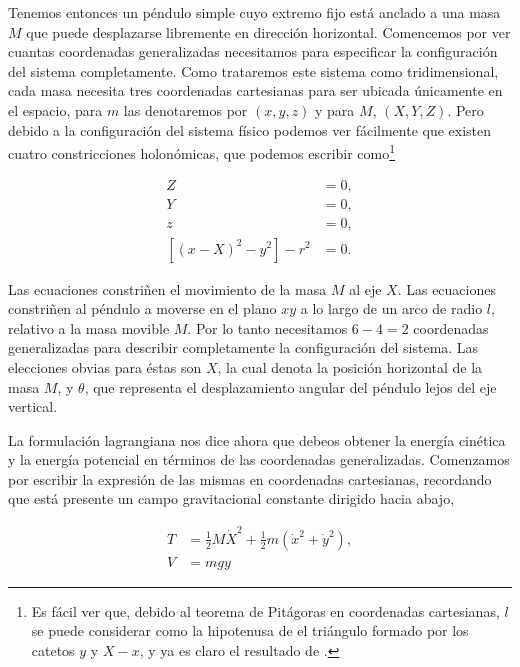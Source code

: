 \documentclass[a4paper,10pt]{article}
\numberwithin{equation}{section}
\begin{document}
Tenemos entonces un péndulo simple cuyo extremo fijo está anclado a una masa $M$ que 
puede desplazarse libremente en dirección horizontal. Comencemos por ver cuantas coordenadas
generalizadas necesitamos para especificar la configuración del sistema completamente. 
Como trataremos este sistema como tridimensional, cada masa necesita tres coordenadas 
cartesianas para ser ubicada únicamente en el espacio, para $m$ las denotaremos por 
$(x,y,z)$ y para $M$, $(X,Y,Z)$. Pero debido a la configuración del sistema físico 
podemos ver fácilmente que existen cuatro constricciones holonómicas, que podemos 
escribir como\footnote{Es fácil ver que, debido al teorema de Pitágoras en coordenadas
cartesianas, $l$ se puede considerar como la hipotenusa de el triángulo formado 
por los catetos $y$ y $X-x$, y ya es claro el resultado de .}

\begin{align}
\label{eq:pendu1}
 Z &= 0, \\
\label{eq:pendu2}
 Y &= 0, \\
\label{eq:pendu3}
 z &= 0, \\
\label{eq:pendu4}
 [(x-X)^2 - y^2] - r^2 &= 0.
\end{align}

Las ecuaciones  constriñen el movimiento de la masa $M$ 
al eje $X$. Las ecuaciones  constriñen al péndulo a moverse 
en el plano $xy$ a lo largo de un arco de radio $l$, relativo a la masa movible $M$. Por 
lo tanto necesitamos $6-4 = 2$ coordenadas generalizadas para describir completamente 
la configuración del sistema. Las elecciones obvias para éstas son $X$, la cual denota 
la posición horizontal de la masa $M$, y $\theta$, que representa el desplazamiento 
angular del péndulo lejos del eje vertical.

\vspace{.3cm}

La formulación lagrangiana nos dice ahora que debeos obtener la energía cinética y la 
energía potencial en términos de las coordenadas generalizadas. Comenzamos por escribir 
la expresión de las mismas en coordenadas cartesianas, recordando que está presente un 
campo gravitacional constante dirigido hacia abajo,

\begin{align}
\label{eq:pendu5}
 T &= \frac{1}{2} M \dot{X}^2 + \frac{1}{2}m(\dot{x}^2+\dot{y}^2), \\
\label{eq:pendu6}
 V &= mgy
 \end{align}
\end{document}
